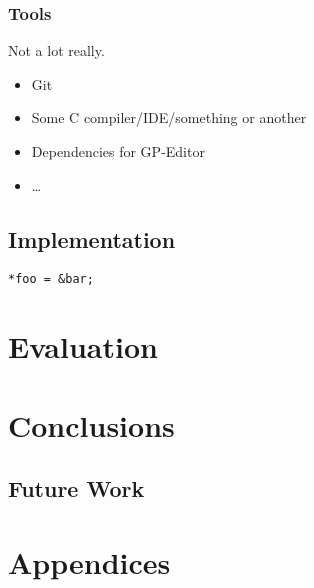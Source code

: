 \documentclass{UoYCSproject}
\begin{document}
\subsection{Tools}
Not a lot really.
\begin{itemize}
  \item Git
  \item Some C compiler/IDE/something or another
  \item Dependencies for GP-Editor
  \item \ldots
\end{itemize}
\section{Implementation}


\begin{lstlisting}[label=c_1, caption=Placeholder C Code]
*foo = &bar;
\end{lstlisting}


\chapter{Evaluation}
\chapter{Conclusions}
\section{Future Work}

% 

\chapter{Appendices}
\end{document}
